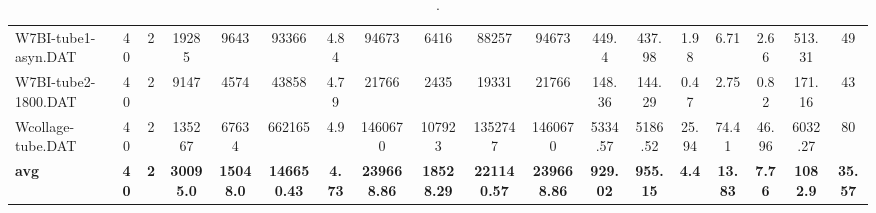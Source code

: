 \begin{sidewaystable}[h]
{\begin{tabular}{lccccccccccccccccc}
W7BI-tube1-asyn.DAT & 40 & 2 & 19285 & 9643 & 93366 & 4.84 & 94673 & 6416 & 88257 & 94673 & 449.4 & 437.98 & 1.98 & 6.71 & 2.66 & 513.31 & 49\\
W7BI-tube2-1800.DAT & 40 & 2 & 9147 & 4574 & 43858 & 4.79 & 21766 & 2435 & 19331 & 21766 & 148.36 & 144.29 & 0.47 & 2.75 & 0.82 & 171.16 & 43\\
Wcollage-tube.DAT & 40 & 2 & 135267 & 67634 & 662165 & 4.9 & 1460670 & 107923 & 1352747 & 1460670 & 5334.57 & 5186.52 & 25.94 & 74.41 & 46.96 & 6032.27 & 80\\
\cline{1-18} \textbf{avg} & \textbf{40} & \textbf{2} & \textbf{30095.0} & \textbf{15048.0} & \textbf{146650.43} & \textbf{4.73} & \textbf{239668.86} & \textbf{18528.29} & \textbf{221140.57} & \textbf{239668.86} & \textbf{929.02} & \textbf{955.15} & \textbf{4.4} & \textbf{13.83} & \textbf{7.76} & \textbf{1082.9} & \textbf{35.57} \\ \cline{1-18}
\bottomrule
\end{tabular}%
}%
\caption{.}
\label{tab:table_bc}
\end{sidewaystable}

